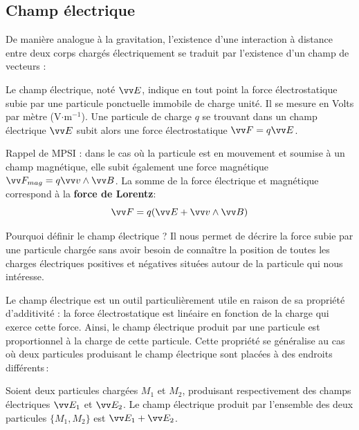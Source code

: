 \documentclass[11pt,fleqn]{book} %
\begin{document}
\subsection{Champ électrique}

De manière analogue à la gravitation, l'existence d'une interaction à distance entre deux corps chargés électriquement se traduit par l'existence d'un champ de vecteurs :

\begin{definition}
    Le champ électrique, noté $\vv E$, indique en tout point la force électrostatique subie par une particule ponctuelle immobile de charge unité. Il se mesure en Volts par mètre (V$\cdot$m$^{-1}$). Une particule de charge $q$ se trouvant dans un champ électrique $\vv E$ subit alors une force électrostatique $\vv F = q \vv E$. 
\end{definition}

\begin{remark}
    Rappel de MPSI : dans le cas où la particule est en mouvement et soumise à un champ magnétique, elle subit également une force magnétique $\vv F_{mag} = q \vv v \wedge \vv B$. La somme de la force électrique et magnétique correspond à la \textbf{force de Lorentz}:
    \begin{equation}
        \vv F = q ( \vv E + \vv v \wedge \vv B )
    \end{equation}
\end{remark}

Pourquoi définir le champ électrique ? Il nous permet de décrire la force subie par une particule chargée sans avoir besoin de connaître la position de toutes les charges électriques positives et négatives situées autour de la particule qui nous intéresse.

Le champ électrique est un outil particulièrement utile en raison de sa propriété d'additivité : la force électrostatique est linéaire en fonction de la charge qui exerce cette force. Ainsi, le champ électrique produit par une particule est proportionnel à la charge de cette particule. Cette propriété se généralise au cas où deux particules produisant le champ électrique sont placées à des endroits différents\,:

\begin{proposition}
    Soient deux particules chargées $M_1$ et $M_2$, produisant respectivement des champs électriques $\vv E_1$ et $\vv E_2$. Le champ électrique produit par l'ensemble des deux particules $\{ M_1,M_2\}$ est $\vv E_1 + \vv E_2$.
\end{proposition}
\end{document}

